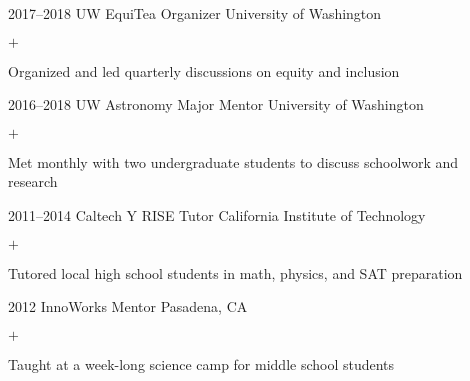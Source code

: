 \documentclass[]{luger-cv} %
\begin{document}
\begin{entrylist}
\entry
{2017--2018}
{UW EquiTea Organizer}
{University of Washington}
{%
\vspace{-1em}
\begin{list}{$+$}{\cvlist}
\item Organized and led quarterly discussions on equity and inclusion
\end{list}
}


\entry
{2016--2018}
{UW Astronomy Major Mentor}
{University of Washington}
{%
\vspace{-1em}
\begin{list}{$+$}{\cvlist}
\item Met monthly with two undergraduate students to discuss schoolwork and research
\end{list}
}


\ifdefined \onepage \else
\end{entrylist}
%
%
\begin{entrylist}
\fi


\entry
{2011--2014}
{Caltech Y RISE Tutor}
{California Institute of Technology}
{%
\vspace{-1em}
\begin{list}{$+$}{\cvlist}
\item Tutored local high school students in math, physics, and SAT preparation
\fi
\end{list}
}

%

\ifdefined \onepage \else
\entry
{2012}
{InnoWorks Mentor}
{Pasadena, CA}
{%
\vspace{-1em}
\begin{list}{$+$}{\cvlist}
\item Taught at a week-long science camp for middle school students
\end{list}
}
\fi


\end{entrylist}



\end{document}

